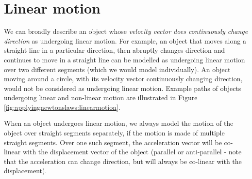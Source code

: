 \section{Linear motion}
We can broadly describe an object whose \textit{velocity vector does continuously change direction} as undergoing linear motion. For example, an object that moves along a straight line in a particular direction, then abruptly changes direction and continues to move in a straight line can be modelled as undergoing linear motion over two different segments (which we would model individually). An object moving around a circle, with its velocity vector continuously changing direction, would not be considered as undergoing linear motion. Example paths of objects undergoing linear and non-linear motion are illustrated in Figure \ref{fig:applyingnewtonslaws:linearmotion}.

When an object undergoes linear motion, we always model the motion of the object over straight segments separately, if the motion is made of multiple straight segments. Over one such segment, the acceleration vector will be co-linear with the displacement vector of the object (parallel or anti-parallel - note that the acceleration can change direction, but will always be co-linear with the displacement).

